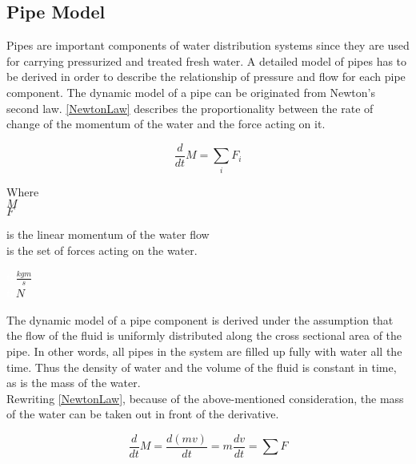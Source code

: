 \subsection{Pipe Model} 
\label{PipeModel}
Pipes are important components of water distribution systems since they are used for carrying pressurized and treated fresh water. A detailed model of pipes has to be derived in order to describe the relationship of pressure and flow for each pipe component.  
%
The dynamic model of a pipe can be originated from Newton's second law. \eqref{NewtonLaw} describes the proportionality between the rate of change of the momentum of the water and the force acting on it.

\begin{equation}
  \frac{d}{dt} M = \sum_i F_i
  \label{NewtonLaw}
\end{equation} 

\begin{minipage}[t]{0.20\textwidth}
Where\\
\hspace*{8mm} $M$ \\
\hspace*{8mm} $F$ 
\end{minipage}
\begin{minipage}[t]{0.68\textwidth}
\vspace*{2mm}
is the linear momentum of the water flow\\
is the set of forces acting on the water.
\end{minipage}
\begin{minipage}[t]{0.10\textwidth}
\vspace*{2mm}
\textcolor{White}{te}$\unit{\frac{kgm}{s}}$\\
\textcolor{White}{te}$\unit{N}$
\end{minipage}

The dynamic model of a pipe component is derived under the assumption that the flow of the fluid is uniformly distributed along the cross sectional area of the pipe. In other words, all pipes in the system are filled up fully with water all the time. Thus the density of water and the volume of the fluid is constant in time, as is the mass of the water.
\\
Rewriting \eqref{NewtonLaw}, because of the above-mentioned consideration, the mass of the water can be taken out in front of the derivative.

\begin{equation}
  \frac{d}{dt} M = {\frac{d(m v)}{dt}} = m \frac{dv}{dt} = \sum F
\end{equation} 

